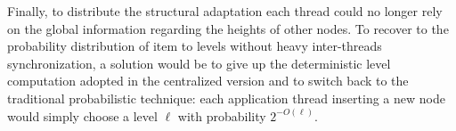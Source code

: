 Finally, to distribute the structural adaptation each thread could no longer rely on the global 
information regarding the heights of other nodes. To recover to the probability distribution of item to 
levels without heavy inter-threads synchronization, a solution would be to give up the 
deterministic level computation adopted in the centralized version and to switch back 
to the traditional probabilistic technique: each application thread inserting a new node would 
simply choose a level $\ell$ with probability $2^{-O(\ell)}$.



%


